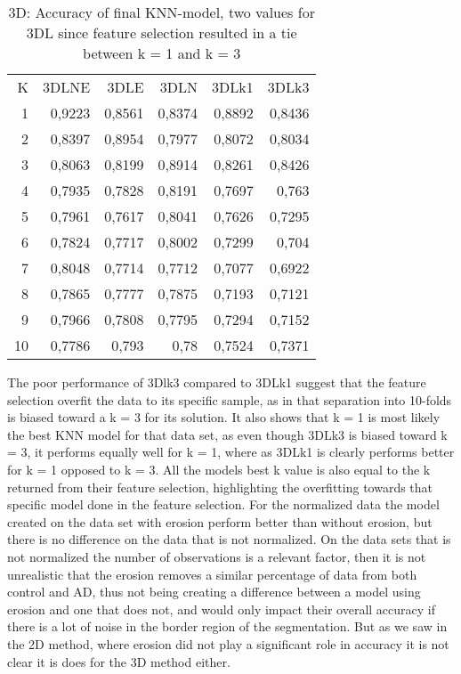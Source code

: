 \begin{table}[H]
  \centering
    \begin{tabular}{rrrrrr}
    K     & 3DLNE & 3DLE  & 3DLN  & 3DLk1 & 3DLk3 \\
    1     & 0,9223 & 0,8561 & 0,8374 & 0,8892 & 0,8436 \\
    2     & 0,8397 & 0,8954 & 0,7977 & 0,8072 & 0,8034 \\
    3     & 0,8063 & 0,8199 & 0,8914 & 0,8261 & 0,8426 \\
    4     & 0,7935 & 0,7828 & 0,8191 & 0,7697 & 0,763 \\
    5     & 0,7961 & 0,7617 & 0,8041 & 0,7626 & 0,7295 \\
    6     & 0,7824 & 0,7717 & 0,8002 & 0,7299 & 0,704 \\
    7     & 0,8048 & 0,7714 & 0,7712 & 0,7077 & 0,6922 \\
    8     & 0,7865 & 0,7777 & 0,7875 & 0,7193 & 0,7121 \\
    9     & 0,7966 & 0,7808 & 0,7795 & 0,7294 & 0,7152 \\
    10    & 0,7786 & 0,793 & 0,78  & 0,7524 & 0,7371 \\
    \end{tabular}%
  \caption{3D: Accuracy of final KNN-model, two values for 3DL since feature selection resulted in a tie between k = 1 and k = 3}\label{tab:3DFinalModel}%
\end{table}%
The poor performance of 3Dlk3 compared to 3DLk1 suggest that the feature selection overfit the data to its specific sample, as in that separation into 10-folds is biased toward a k = 3 for its solution. It also shows that k = 1 is most likely the best KNN model for that data set, as even though 3DLk3 is biased toward k = 3, it performs equally well for k = 1, where as 3DLk1 is clearly performs better for k = 1 opposed to k = 3. All the models best k value is also equal to the k returned from their feature selection, highlighting the overfitting towards that specific model done in the feature selection.
For the normalized data the model created on the data set with erosion perform better than without erosion, but there is no difference on the data that is not normalized. On the data sets that is not normalized the number of observations is a relevant factor, then it is not unrealistic that the erosion removes a similar percentage of data from both control and AD, thus not being creating a difference between a model using erosion and one that does not, and would only impact their overall accuracy if there is a lot of noise in the border region of the segmentation. But as we saw in the 2D method, where erosion did not play a significant role in accuracy it is not clear it is does for the 3D method either.
















 